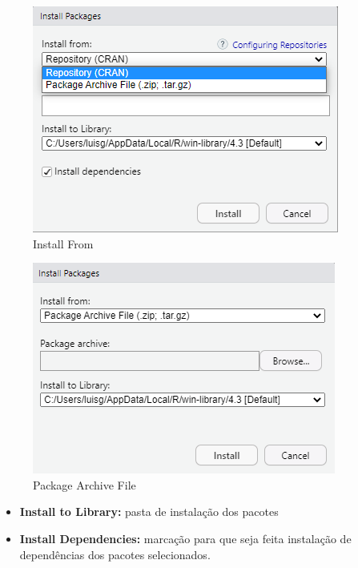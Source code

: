 \documentclass[
  letterpaper,
  DIV=11,
  numbers=noendperiod]{scrreprt}
\begin{document}
\begin{figure}

{\centering \includegraphics{./images/rstudio/menu_tools_inst_pkgs_from.png}

}

\caption{\label{fig-rstudio-menu-inst-pkgs-from}Install From}

\end{figure}

\begin{figure}

{\centering \includegraphics{./images/rstudio/menu_tools_inst_pkgs_archive.png}

}

\caption{\label{fig-rstudio-menu-inst-pkgs-archive}Package Archive File}

\end{figure}

\begin{itemize}
\item
  \textbf{Install to Library:} pasta de instalação dos pacotes
\item
  \textbf{Install Dependencies:} marcação para que seja feita instalação
  de dependências dos pacotes selecionados.
\end{itemize}
\end{document}
